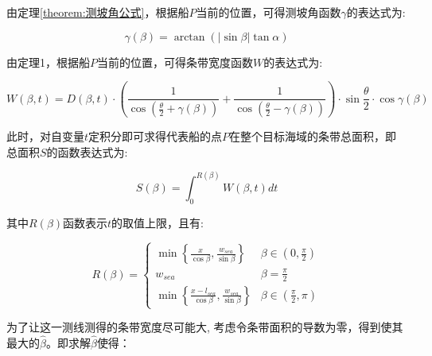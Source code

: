 由定理\ref{theorem:测坡角公式}，根据船$P$当前的位置，可得测坡角函数$\gamma$的表达式为:

\begin{equation}
    \gamma(\beta) = 
    \arctan \left(|\sin \beta| \tan \alpha\right)
\end{equation}

由定理1，根据船$P$当前的位置，可得条带宽度函数$W$的表达式为:

\begin{equation}
    W(\beta, t) = 
    D(\beta, t)\cdot 
    \left(
        \frac{1}{\cos (\frac{\theta}{2} + \gamma(\beta))} +
        \frac{1}{\cos (\frac{\theta}{2} - \gamma(\beta))}
    \right)\cdot
    \sin {\frac{\theta}{2}}\cdot \cos \gamma(\beta)
\end{equation}

此时，对自变量$t$定积分即可求得代表船的点$P$在整个目标海域的条带总面积，即总面积$S$的函数表达式为:

\begin{equation}
    S(\beta) = 
    \int _{0} ^{R(\beta)} {
        W(\beta, t)dt
    }
\end{equation}

其中$R(\beta)$函数表示$t$的取值上限，且有:

\begin{equation}
    R(\beta) = 
    \begin{cases}
        \min \left \{
                \frac{x}{\cos \beta}, 
                \frac{w_{sea}}{\sin \beta}
            \right \}
        & \beta \in \left(0, \frac{\pi}{2} \right)\\
        w_{sea} & \beta = \frac{\pi}{2}\\
        \min \left \{
                \frac{x - l_{sea}}{\cos \beta}, 
                \frac{w_{sea}}{\sin \beta}
            \right \}
        & \beta \in \left(\frac{\pi}{2}, \pi \right) 
    \end{cases}
\end{equation}

为了让这一测线测得的条带宽度尽可能大, 考虑令条带面积的导数为零，得到使其最大的$\hat \beta$。即求解$\hat \beta$使得：

